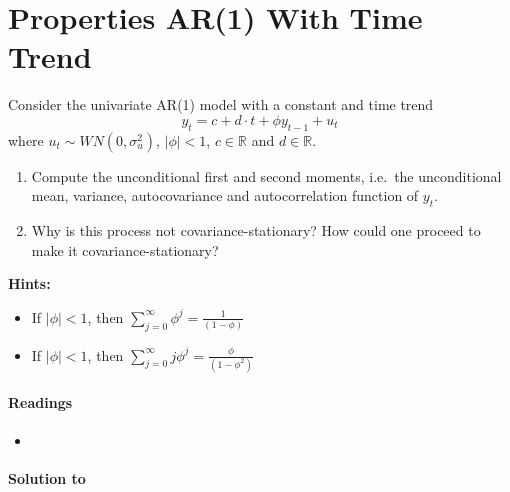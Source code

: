 \section[Properties AR(1) With Time Trend]{Properties AR(1) With Time Trend\label{ex:PropertiesAR1TimeTrend}}

Consider the univariate AR(1) model with a constant and time trend
\[ y_t = c + d\cdot t + \phi y_{t-1} + u_t\]
where \(u_t \sim WN(0,\sigma_u^2)\), \(|\phi|<1\), \(c \in \mathbb{R}\) and \(d \in \mathbb{R}\).
\begin{enumerate}
	\item Compute the unconditional first and second moments, i.e.\ the unconditional mean, variance, autocovariance and autocorrelation function of \(y_t\).
	\item Why is this process not covariance-stationary? How could one proceed to make it covariance-stationary?
\end{enumerate}
\textbf{Hints:}
\begin{itemize}
	\item If \(|\phi|<1\), then \(\sum_{j=0}^{\infty} \phi^j = \frac{1}{(1-\phi)}\)
	\item If \(|\phi|<1\), then \(\sum_{j=0}^{\infty} j \phi^j = \frac{\phi}{(1-\phi^2)}\)
\end{itemize}

\paragraph{Readings}
\begin{itemize}
	\item \textcite{Lutkepohl_2004_UnivariateTimeSeries}
\end{itemize}

\begin{solution}\textbf{Solution to }
\ifDisplaySolutions

\fi
\newpage
\end{solution}